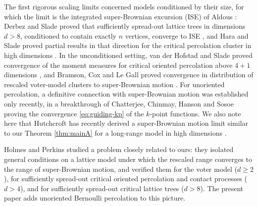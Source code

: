 \documentclass[11pt]{article}
\theoremstyle{definition}
\theoremstyle{remark}
\numberwithin{equation}{section}
\theoremstyle{plain}
\theoremstyle{definition}
\theoremstyle{remark}
\theoremstyle{plain}
\begin{document}
The first rigorous
scaling limits concerned models conditioned by their size, for which the limit
is the integrated super-Brownian excursion (ISE) of Aldous \cite{AldISE}:
Derbez and Slade proved that sufficiently spread-out lattice trees in
dimensions $d>8$, conditioned to contain exactly $n$ vertices, converge to ISE
\cite{DS98}, and Hara and Slade proved partial results in that direction for the
critical percolation cluster in high dimensions \cite{HS00a,HS00b}. In the
unconditioned setting, van der Hofstad and Slade proved convergence of the
moment measures for critical oriented percolation above $4+1$ dimensions
\cite{vdHS03}, and Bramson, Cox and Le Gall proved convergence in distribution
of rescaled voter-model clusters to super-Brownian motion \cite{BCL01}.
For unoriented percolation, a definitive connection with
super-Brownian motion was established only recently, in a breakthrough of
Chatterjee, Chinmay, Hanson and Sosoe \cite{CCHS26} proving the convergence
\eqref{eq:guiding-kp} of the $k$-point functions. We also note here that Hutchcroft has recently derived a super-Brownian motion limit similar to our Theorem \ref{thm:mainA} for a long-range model in high dimensions \cite{hutchcroft}.

Holmes and Perkins \cite{HP} studied a problem closely
related to ours: they isolated general conditions on a lattice model under
which the rescaled range converges to the range of super-Brownian motion, and
verified them for the voter model ($d\ge2$), for sufficiently spread-out
critical oriented percolation and contact processes ($d>4$), and for
sufficiently spread-out critical lattice trees ($d>8$). The present paper adds
unoriented Bernoulli percolation to this picture.
\end{document}
